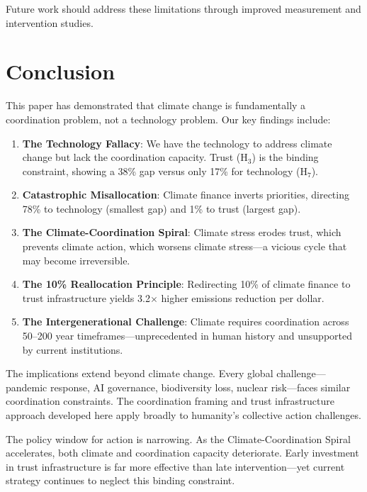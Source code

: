 \documentclass[12pt,a4paper]{article}
\begin{document}
Future work should address these limitations through improved measurement and intervention studies.

\section{Conclusion}
\label{sec:conclusion}

This paper has demonstrated that climate change is fundamentally a coordination problem, not a technology problem. Our key findings include:

\begin{enumerate}
    \item \textbf{The Technology Fallacy}: We have the technology to address climate change but lack the coordination capacity. Trust (H$_3$) is the binding constraint, showing a 38\% gap versus only 17\% for technology (H$_7$).

    \item \textbf{Catastrophic Misallocation}: Climate finance inverts priorities, directing 78\% to technology (smallest gap) and 1\% to trust (largest gap).

    \item \textbf{The Climate-Coordination Spiral}: Climate stress erodes trust, which prevents climate action, which worsens climate stress---a vicious cycle that may become irreversible.

    \item \textbf{The 10\% Reallocation Principle}: Redirecting 10\% of climate finance to trust infrastructure yields 3.2$\times$ higher emissions reduction per dollar.

    \item \textbf{The Intergenerational Challenge}: Climate requires coordination across 50--200 year timeframes---unprecedented in human history and unsupported by current institutions.
\end{enumerate}

The implications extend beyond climate change. Every global challenge---pandemic response, AI governance, biodiversity loss, nuclear risk---faces similar coordination constraints. The coordination framing and trust infrastructure approach developed here apply broadly to humanity's collective action challenges.

The policy window for action is narrowing. As the Climate-Coordination Spiral accelerates, both climate and coordination capacity deteriorate. Early investment in trust infrastructure is far more effective than late intervention---yet current strategy continues to neglect this binding constraint.
\end{document}
